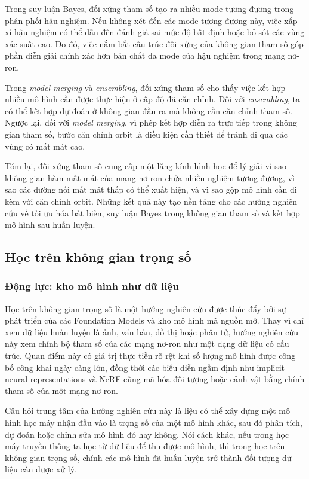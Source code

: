 Trong suy luận Bayes, đối xứng tham số tạo ra nhiều mode tương đương trong phân phối hậu nghiệm. Nếu không xét đến các mode tương đương này, việc xấp xỉ hậu nghiệm có thể dẫn đến đánh giá sai mức độ bất định hoặc bỏ sót các vùng xác suất cao. Do đó, việc nắm bắt cấu trúc đối xứng của không gian tham số góp phần diễn giải chính xác hơn bản chất đa mode của hậu nghiệm trong mạng nơ-ron.

Trong \textit{model merging} và \textit{ensembling}, đối xứng tham số cho thấy việc kết hợp nhiều mô hình cần được thực hiện ở cấp độ đã căn chỉnh. Đối với \textit{ensembling}, ta có thể kết hợp dự đoán ở không gian đầu ra mà không cần căn chỉnh tham số. Ngược lại, đối với \textit{model merging}, vì phép kết hợp diễn ra trực tiếp trong không gian tham số, bước căn chỉnh orbit là điều kiện cần thiết để tránh đi qua các vùng có mất mát cao.

Tóm lại, đối xứng tham số cung cấp một lăng kính hình học để lý giải vì sao không gian hàm mất mát của mạng nơ-ron chứa nhiều nghiệm tương đương, vì sao các đường nối mất mát thấp có thể xuất hiện, và vì sao gộp mô hình cần đi kèm với căn chỉnh orbit. Những kết quả này tạo nền tảng cho các hướng nghiên cứu về tối ưu hóa bất biến, suy luận Bayes trong không gian tham số và kết hợp mô hình sau huấn luyện.


\subsection{Học trên không gian trọng số}
\label{subsec:weight-space-learning}

\subsubsection{Động lực: kho mô hình như dữ liệu}

Học trên không gian trọng số là một hướng nghiên cứu được thúc đẩy bởi sự phát triển của các Foundation Models và kho mô hình mã nguồn mở. Thay vì chỉ xem dữ liệu huấn luyện là ảnh, văn bản, đồ thị hoặc phân tử, hướng nghiên cứu này xem chính bộ tham số của các mạng nơ-ron như một dạng dữ liệu có cấu trúc. Quan điểm này có giá trị thực tiễn rõ rệt khi số lượng mô hình được công bố công khai ngày càng lớn, đồng thời các biểu diễn ngầm định như implicit neural representations và NeRF cũng mã hóa đối tượng hoặc cảnh vật bằng chính tham số của một mạng nơ-ron.

Câu hỏi trung tâm của hướng nghiên cứu này là liệu có thể xây dựng một mô hình học máy nhận đầu vào là trọng số của một mô hình khác, sau đó phân tích, dự đoán hoặc chỉnh sửa mô hình đó hay không. Nói cách khác, nếu trong học máy truyền thống ta học từ dữ liệu để thu được mô hình, thì trong học trên không gian trọng số, chính các mô hình đã huấn luyện trở thành đối tượng dữ liệu cần được xử lý.

